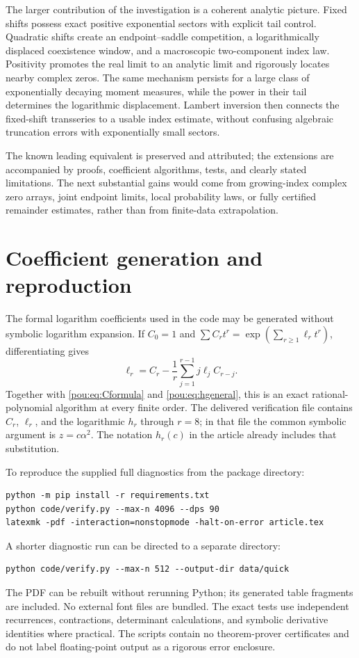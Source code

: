 \documentclass[11pt]{article}
\theoremstyle{definition}
\theoremstyle{remark}
\begin{document}
The larger contribution of the investigation is a coherent analytic
picture.  Fixed shifts possess exact positive exponential sectors with
explicit tail control.  Quadratic shifts create an endpoint--saddle
competition, a logarithmically displaced coexistence window, and a
macroscopic two-component index law.  Positivity promotes the real limit
to an analytic limit and rigorously locates nearby complex zeros.
The same mechanism persists for a
large class of exponentially decaying moment measures, while the power
in their tail determines the logarithmic displacement.  Lambert inversion
then connects the fixed-shift transseries to a usable index estimate,
without confusing algebraic truncation errors with exponentially small
sectors.

The known leading equivalent is preserved and attributed; the extensions
are accompanied by proofs, coefficient algorithms, tests, and clearly
stated limitations.  The next substantial gains would come from growing-index complex
zero arrays, joint endpoint limits, local probability laws, or fully
certified remainder estimates, rather than from finite-data extrapolation.

\appendix
\section{Coefficient generation and reproduction}\label{pou:sec:reproduce}

The formal logarithm coefficients used in the code may be generated without
symbolic logarithm expansion.  If $C_0=1$ and
$\sum C_rt^r=\exp(\sum_{r\ge1}\ell_rt^r)$, differentiating gives
\[
 \ell_r=C_r-\frac1r\sum_{j=1}^{r-1}j\ell_jC_{r-j}.
\]
Together with \eqref{pou:eq:Cformula} and \eqref{pou:eq:hgeneral}, this is an exact
rational-polynomial algorithm at every finite order.  The delivered
verification file contains $C_r$, $\ell_r$, and the logarithmic $h_r$
through $r=8$; in that file the common symbolic argument is $z=c\alpha^2$.
The notation $h_r(c)$ in the article already includes that substitution.

To reproduce the supplied full diagnostics from the package directory:
\begin{verbatim}
python -m pip install -r requirements.txt
python code/verify.py --max-n 4096 --dps 90
latexmk -pdf -interaction=nonstopmode -halt-on-error article.tex
\end{verbatim}
A shorter diagnostic run can be directed to a separate directory:
\begin{verbatim}
python code/verify.py --max-n 512 --output-dir data/quick
\end{verbatim}
The PDF can be rebuilt without rerunning Python; its generated table
fragments are included.  No external font files are bundled.
The exact tests use independent recurrences, contractions, determinant
calculations, and symbolic derivative identities where practical.
The scripts contain no theorem-prover certificates and do not label
floating-point output as a rigorous error enclosure.
\end{document}
